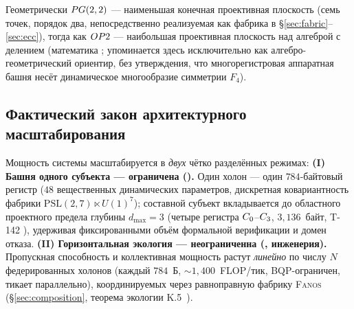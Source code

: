 \noindent Геометрически $PG(2,2)$ --- наименьшая конечная проективная плоскость
(семь точек, порядок два, непосредственно реализуемая как фабрика \TALOS{} в
\S\ref{sec:fabric}--\ref{sec:ecc}), тогда как $OP2$ --- наибольшая
проективная плоскость над алгеброй с делением (математика ;
упоминается здесь исключительно как алгебро-геометрический ориентир, без
утверждения, что многорегистровая аппаратная башня несёт динамическое
многообразие симметрии $F_4$).

\subsection{Фактический закон архитектурного масштабирования}
\label{subsec:scaling-law}

\begin{claimbox}
Мощность системы масштабируется в \emph{двух} чётко разделённых режимах:
\textbf{(I) Башня одного субъекта --- ограничена ().} Один холон ---
один $784$-байтовый регистр \DM{} ($48$ вещественных динамических параметров,
дискретная ковариантность фабрики $\mathrm{PSL}(2,7)\ltimes U(1)^7$); составной
субъект вкладывается до областного проектного предела глубины $d_{\max}=3$
(четыре регистра $C_0$--$C_3$, $3{,}136$~байт, T-142 ),
удерживая фиксированными объём формальной верификации и домен отказа.
\textbf{(II) Горизонтальная экология --- неограниченна (, инженерия).}
Пропускная способность и коллективная мощность растут \emph{линейно} по числу
$N$ федерированных холонов (каждый $784$~Б, ${\sim}1{,}400$~FLOP/тик,
BQP-ограничен, тикает параллельно), координируемых через равноправную фабрику
\textsc{Fanos} (\S\ref{sec:composition}, теорема экологии \SYNARC{}
K.5~\cite{synarc2026}).
\end{claimbox}

